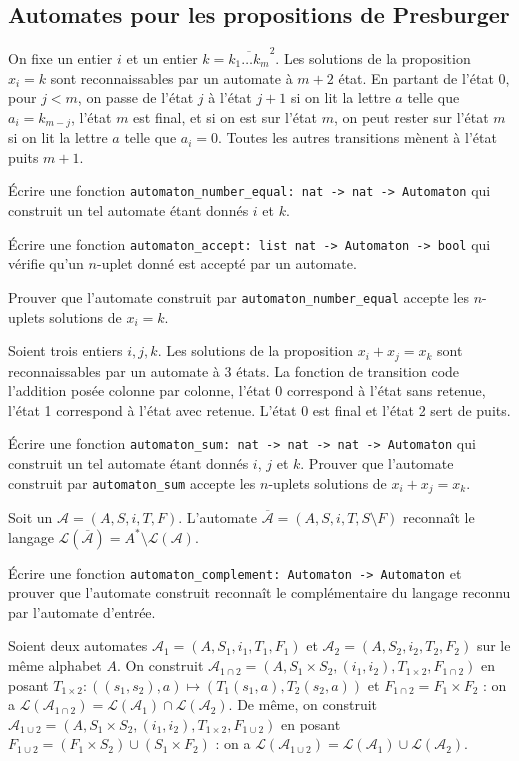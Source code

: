 \documentclass{article}
\begin{document}
\subsection{Automates pour les propositions de Presburger}

On fixe un entier \(i\) et un entier \(k = \overline{k_1 \dots k_m}^2\). Les solutions de la proposition \(x_i = k\) sont reconnaissables par un automate à \(m + 2\) état. En partant de l'état 0, pour \(j < m\), on passe de l'état \(j\) à l'état \(j + 1\) si on lit la lettre \(a\) telle que \(a_i = k_{m - j}\), l'état \(m\) est final, et si on est sur l'état \(m\), on peut rester sur l'état \(m\) si on lit la lettre \(a\) telle que \(a_i = 0\). Toutes les autres transitions mènent à l'état puits \(m + 1\).

Écrire une fonction \texttt{automaton_number_equal: nat -> nat -> Automaton} qui construit un tel automate étant donnés \(i\) et \(k\).

Écrire une fonction \texttt{automaton_accept: list nat -> Automaton -> bool} qui vérifie qu'un \(n\)-uplet donné est accepté par un automate.

Prouver que l'automate construit par \texttt{automaton_number_equal} accepte les \(n\)-uplets solutions de \(x_i = k\).

Soient trois entiers \(i, j, k\). Les solutions de la proposition \(x_i + x_j = x_k\) sont reconnaissables par un automate à 3 états. La fonction de transition code l'addition posée colonne par colonne, l'état 0 correspond à l'état sans retenue, l'état 1 correspond à l'état avec retenue. L'état 0 est final et l'état 2 sert de puits.

Écrire une fonction \texttt{automaton_sum: nat -> nat -> nat -> Automaton} qui construit un tel automate étant donnés \(i\), \(j\) et \(k\). Prouver que l'automate construit par \texttt{automaton_sum} accepte les \(n\)-uplets solutions de \(x_i + x_j = x_k\).

Soit un \(\mathcal A = (A, S, i, T, F)\). L'automate \(\overline{\mathcal A} = (A, S, i, T, S \setminus F)\) reconnaît le langage \(\mathcal L(\overline{\mathcal A}) = A^* \setminus \mathcal L(\mathcal A)\).

Écrire une fonction \texttt{automaton_complement: Automaton -> Automaton} et prouver que l'automate construit reconnaît le complémentaire du langage reconnu par l'automate d'entrée.

Soient deux automates \(\mathcal A_1 = (A, S_1, i_1, T_1, F_1)\) et \(\mathcal A_2 = (A, S_2, i_2, T_2, F_2)\) sur le même alphabet \(A\).
On construit \(\mathcal A_{1 \cap 2} = (A, S_1 \times S_2, (i_1, i_2), T_{1 \times 2}, F_{1 \cap 2})\) en posant \(T_{1 \times 2} : ((s_1, s_2), a) \mapsto (T_1(s_1, a), T_2(s_2, a))\) et \(F_{1 \cap 2} = F_1 \times F_2\) : on a \(\mathcal L(\mathcal A_{1 \cap 2}) = \mathcal L(\mathcal A_1) \cap \mathcal L(\mathcal A_2)\).
De même, on construit \(\mathcal A_{1 \cup 2} = (A, S_1 \times S_2, (i_1, i_2), T_{1 \times 2}, F_{1 \cup 2})\)
en posant \(F_{1 \cup 2} = (F_1 \times S_2) \cup (S_1 \times F_2)\) :
on a \(\mathcal L(\mathcal A_{1 \cup 2}) = \mathcal L(\mathcal A_1) \cup \mathcal L(\mathcal A_2)\).
\end{document}
